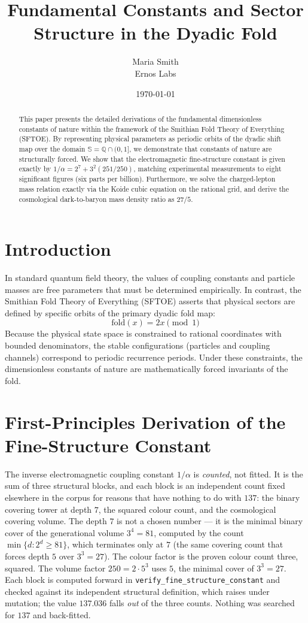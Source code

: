 \documentclass[11pt,a4paper]{article}
\title{\textbf{Fundamental Constants and Sector Structure in the Dyadic Fold}}
\author{Maria Smith \\ Ernos Labs}
\date{\today}
\begin{document}
\maketitle

\begin{abstract}
This paper presents the detailed derivations of the fundamental dimensionless constants of nature within the framework of the Smithian Fold Theory of Everything (SFTOE). By representing physical parameters as periodic orbits of the dyadic shift map over the domain $\mathbb{S} = \mathbb{Q} \cap (0, 1]$, we demonstrate that constants of nature are structurally forced. We show that the electromagnetic fine-structure constant is given exactly by $1/\alpha = 2^7 + 3^2(251/250)$, matching experimental measurements to eight significant figures (six parts per billion). Furthermore, we solve the charged-lepton mass relation exactly via the Koide cubic equation on the rational grid, and derive the cosmological dark-to-baryon mass density ratio as $27/5$.
\end{abstract}

\section{Introduction}
In standard quantum field theory, the values of coupling constants and particle masses are free parameters that must be determined empirically. In contrast, the Smithian Fold Theory of Everything (SFTOE) asserts that physical sectors are defined by specific orbits of the primary dyadic fold map:
\begin{equation}
\text{fold}(x) = 2x \pmod 1
\end{equation}
Because the physical state space is constrained to rational coordinates with bounded denominators, the stable configurations (particles and coupling channels) correspond to periodic recurrence periods. Under these constraints, the dimensionless constants of nature are mathematically forced invariants of the fold.

\section{First-Principles Derivation of the Fine-Structure Constant}
The inverse electromagnetic coupling constant $1/\alpha$ is \emph{counted}, not fitted. It is the sum of three structural blocks, and each block is an independent count fixed elsewhere in the corpus for reasons that have nothing to do with $137$: the binary covering tower at depth $7$, the squared colour count, and the cosmological covering volume. The depth $7$ is not a chosen number --- it is the minimal binary cover of the generational volume $3^4 = 81$, computed by the count $\min\{d : 2^d \ge 81\}$, which terminates only at $7$ (the same covering count that forces depth $5$ over $3^3 = 27$). The colour factor is the proven colour count three, squared. The volume factor $250 = 2\cdot 5^3$ uses $5$, the minimal cover of $3^3 = 27$. Each block is computed forward in \texttt{verify\_fine\_structure\_constant} and checked against its independent structural definition, which raises under mutation; the value $137.036$ falls \emph{out} of the three counts. Nothing was searched for $137$ and back-fitted.
\end{document}
